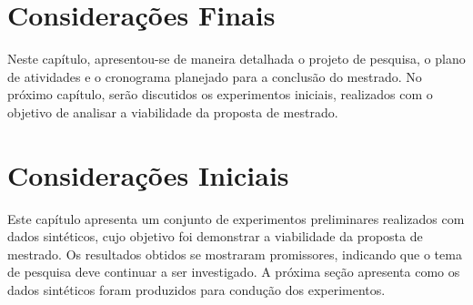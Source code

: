\documentclass[msc, classic, a4paper]{ufbathesis}
\begin{document}




\section{Considerações Finais}

Neste capítulo, apresentou-se de maneira detalhada o projeto de pesquisa, o plano de atividades e o cronograma planejado para a conclusão do mestrado.
No próximo capítulo, serão discutidos os experimentos iniciais, realizados com o objetivo de analisar a viabilidade da proposta de mestrado.

 \label{experimentos_iniciais}
\section{Considerações Iniciais}

Este capítulo apresenta um conjunto de experimentos preliminares realizados com dados sintéticos, cujo objetivo foi demonstrar a viabilidade da proposta de mestrado.
%
Os resultados obtidos se mostraram promissores, indicando que o tema de pesquisa deve continuar a ser investigado.
%
A próxima seção apresenta como os dados sintéticos foram produzidos para condução dos experimentos.
\end{document}
